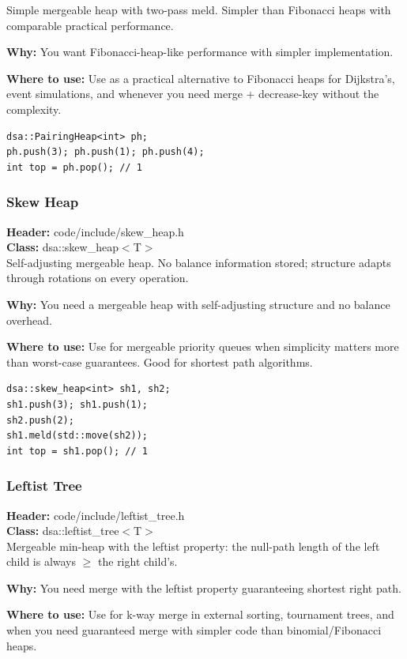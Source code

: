 \documentclass[11pt]{article}
\begin{document}
Simple mergeable heap with two-pass meld. Simpler than Fibonacci heaps with comparable practical performance.

\textbf{Why:} You want Fibonacci-heap-like performance with simpler implementation. \par \textbf{Where to use:} Use as a practical alternative to Fibonacci heaps for Dijkstra's, event simulations, and whenever you need merge + decrease-key without the complexity.

\begin{lstlisting}
dsa::PairingHeap<int> ph;
ph.push(3); ph.push(1); ph.push(4);
int top = ph.pop(); // 1
\end{lstlisting}

\subsubsection{Skew Heap}
\textbf{Header:} code/include/skew\_heap.h\\
\textbf{Class:} dsa::skew\_heap$<$T$>$\\

Self-adjusting mergeable heap. No balance information stored; structure adapts through rotations on every operation.

\textbf{Why:} You need a mergeable heap with self-adjusting structure and no balance overhead. \par \textbf{Where to use:} Use for mergeable priority queues when simplicity matters more than worst-case guarantees. Good for shortest path algorithms.

\begin{lstlisting}
dsa::skew_heap<int> sh1, sh2;
sh1.push(3); sh1.push(1);
sh2.push(2);
sh1.meld(std::move(sh2));
int top = sh1.pop(); // 1
\end{lstlisting}

\subsubsection{Leftist Tree}
\textbf{Header:} code/include/leftist\_tree.h\\
\textbf{Class:} dsa::leftist\_tree$<$T$>$\\

Mergeable min-heap with the leftist property: the null-path length of the left child is always $\geq$ the right child's.

\textbf{Why:} You need merge with the leftist property guaranteeing shortest right path. \par \textbf{Where to use:} Use for k-way merge in external sorting, tournament trees, and when you need guaranteed merge with simpler code than binomial/Fibonacci heaps.
\end{document}
